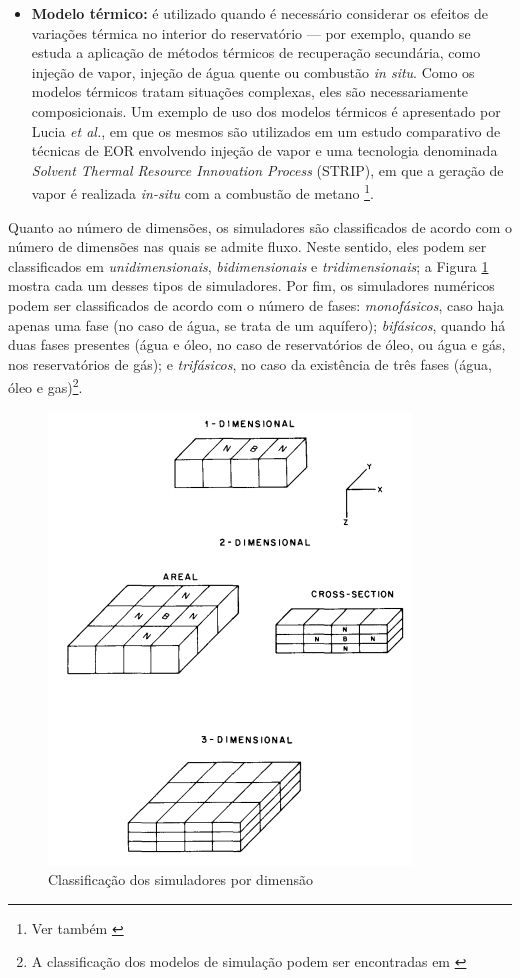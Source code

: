 \begin{itemize}
	\item \textbf{Modelo t\'{e}rmico:} \'{e} utilizado quando \'{e} necess\'{a}rio considerar os efeitos de varia\c{c}\~{o}es t\'{e}rmica no interior do reservat\'{o}rio --- por exemplo, quando se estuda a aplica\c{c}\~{a}o de m\'{e}todos t\'{e}rmicos de recupera\c{c}\~{a}o secund\'{a}ria, como inje\c{c}\~{a}o de vapor, inje\c{c}\~{a}o de \'{a}gua quente ou combust\~{a}o \textit{in situ}. Como os modelos t\'{e}rmicos tratam situa\c{c}\~{o}es complexas, eles s\~{a}o necessariamente composicionais. Um exemplo de uso dos modelos térmicos é apresentado por Lucia \textit{et al.}, em que os mesmos são utilizados em um estudo comparativo de técnicas de EOR envolvendo injeção de vapor e uma tecnologia denominada \textit{Solvent Thermal Resource Innovation Process} (STRIP), em que a geração de vapor é realizada \textit{in-situ} com a combustão de metano \cite{luciaetal}\footnote{Ver tamb\'{e}m \cite{ZAYDULLIN201451}}.
\end{itemize}

Quanto ao n\'{u}mero de dimens\~{o}es, os simuladores s\~{a}o classificados de acordo com o n\'{u}mero de dimens\~{o}es nas quais se admite fluxo. Neste sentido, eles podem ser classificados em \textit{unidimensionais}, \textit{bidimensionais} e \textit{tridimensionais}; a Figura \ref{fig:revisao_DIM} mostra cada um desses tipos de simuladores. Por fim, os simuladores num\'{e}ricos podem ser classificados de acordo com o n\'{u}mero de fases: \textit{monof\'{a}sicos}, caso haja apenas uma fase (no caso de \'{a}gua, se trata de um aqu\'{i}fero); \textit{bif\'{a}sicos}, quando h\'{a} duas fases presentes (\'{a}gua e \'{o}leo, no caso de reservat\'{o}rios de \'{o}leo, ou \'{a}gua e g\'{a}s, nos reservat\'{o}rios de g\'{a}s); e \textit{trif\'{a}sicos}, no caso da exist\^{e}ncia de tr\^{e}s fases (\'{a}gua, \'{o}leo e gas)\footnote{A classifica\c{c}\~{a}o dos modelos de simula\c{c}\~{a}o podem ser encontradas em \cite[pp. 517--519]{engres}}.

\begin{figure}[!ht]
	\centering
	\includegraphics[width=.6\textwidth]{figs/revisao/revisao_DIM}
	\caption{Classifica\c{c}\~{a}o dos simuladores por dimens\~{a}o \cite{coats1982} \label{fig:revisao_DIM}}
\end{figure}

